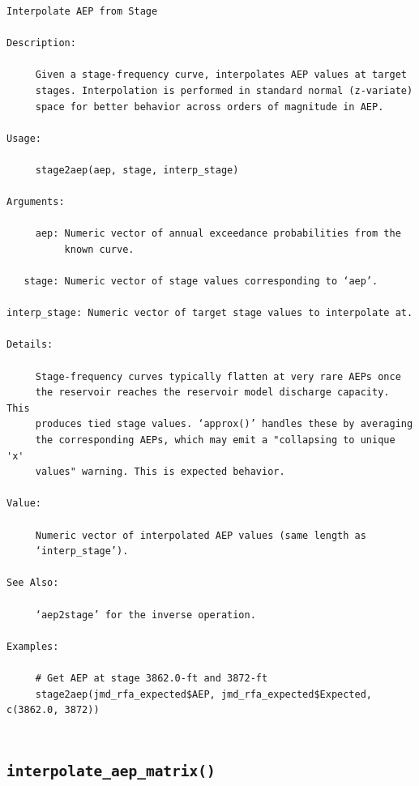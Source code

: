 \documentclass[
  letterpaper,
  DIV=11,
  numbers=noendperiod]{scrreprt}
\begin{document}
\begin{verbatim}
Interpolate AEP from Stage

Description:

     Given a stage-frequency curve, interpolates AEP values at target
     stages. Interpolation is performed in standard normal (z-variate)
     space for better behavior across orders of magnitude in AEP.

Usage:

     stage2aep(aep, stage, interp_stage)
     
Arguments:

     aep: Numeric vector of annual exceedance probabilities from the
          known curve.

   stage: Numeric vector of stage values corresponding to ‘aep’.

interp_stage: Numeric vector of target stage values to interpolate at.

Details:

     Stage-frequency curves typically flatten at very rare AEPs once
     the reservoir reaches the reservoir model discharge capacity. This
     produces tied stage values. ‘approx()’ handles these by averaging
     the corresponding AEPs, which may emit a "collapsing to unique 'x'
     values" warning. This is expected behavior.

Value:

     Numeric vector of interpolated AEP values (same length as
     ‘interp_stage’).

See Also:

     ‘aep2stage’ for the inverse operation.

Examples:

     # Get AEP at stage 3862.0-ft and 3872-ft
     stage2aep(jmd_rfa_expected$AEP, jmd_rfa_expected$Expected, c(3862.0, 3872))
     
\end{verbatim}

\subsection{\texorpdfstring{\texttt{interpolate\_aep\_matrix()}}{interpolate\_aep\_matrix()}}\label{interpolate_aep_matrix}
\end{document}
